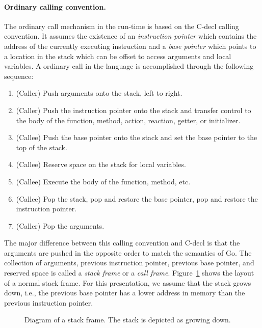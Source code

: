 \paragraph{Ordinary calling convention.}
The ordinary call mechanism in the run-time is based on the C-decl calling convention.
It assumes the existence of an \emph{instruction pointer} which contains the address of the currently executing instruction and a \emph{base pointer} which points to a location in the stack which can be offset to access arguments and local variables.
A ordinary call in the language is accomplished through the following sequence:
\begin{enumerate}
\item (Caller) Push arguments onto the stack, left to right.
\item (Caller) Push the instruction pointer onto the stack and transfer control to the body of the function, method, action, reaction, getter, or initializer.
\item (Callee) Push the base pointer onto the stack and set the base pointer to the top of the stack.
\item (Callee) Reserve space on the stack for local variables.
\item (Callee) Execute the body of the function, method, etc.
\item (Callee) Pop the stack, pop and restore the base pointer, pop and restore the instruction pointer.
\item (Caller) Pop the arguments.
\end{enumerate}
The major difference between this calling convention and C-decl is that the arguments are pushed in the opposite order to match the semantics of Go.
The collection of arguments, previous instruction pointer, previous base pointer, and reserved space is called a \emph{stack frame} or a \emph{call frame}.
Figure~\ref{frame} shows the layout of a normal stack frame.
For this presentation, we assume that the stack grows down, i.e., the previous base pointer has a lower address in memory than the previous instruction pointer.

\begin{figure}
\centering
{}%
\caption{Diagram of a stack frame\label{frame}.  The stack is depicted as growing down.}
\end{figure}

